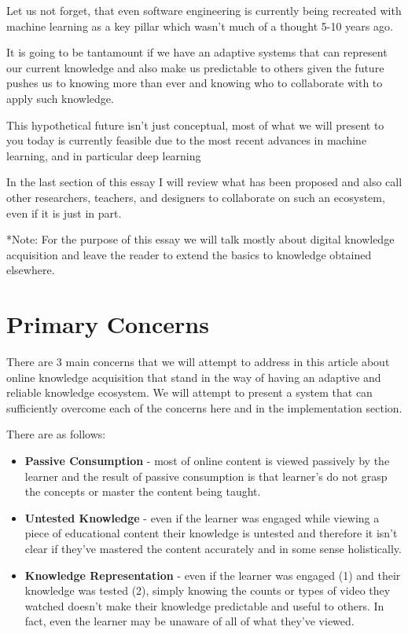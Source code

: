 \documentclass[]{book}
\theoremstyle{definition}
\theoremstyle{definition}
\theoremstyle{definition}
\theoremstyle{remark}
\begin{document}
Let us not forget, that even software engineering is currently being
recreated with machine learning as a key pillar which wasn't much of a
thought 5-10 years ago.

It is going to be tantamount if we have an adaptive systems that can
represent our current knowledge and also make us predictable to others
given the future pushes us to knowing more than ever and knowing who to
collaborate with to apply such knowledge.

This hypothetical future isn't just conceptual, most of what we will
present to you today is currently feasible due to the most recent
advances in machine learning, and in particular deep learning

In the last section of this essay I will review what has been proposed
and also call other researchers, teachers, and designers to collaborate
on such an ecosystem, even if it is just in part.

*Note: For the purpose of this essay we will talk mostly about digital
knowledge acquisition and leave the reader to extend the basics to
knowledge obtained elsewhere.

\chapter{Primary Concerns}\label{primary-concerns}

There are 3 main concerns that we will attempt to address in this
article about online knowledge acquisition that stand in the way of
having an adaptive and reliable knowledge ecosystem. We will attempt to
present a system that can sufficiently overcome each of the concerns
here and in the implementation section.

There are as follows:

\begin{itemize}
\item
  \textbf{Passive Consumption} - most of online content is viewed
  passively by the learner and the result of passive consumption is that
  learner's do not grasp the concepts or master the content being
  taught.
\item
  \textbf{Untested Knowledge} - even if the learner was engaged while
  viewing a piece of educational content their knowledge is untested and
  therefore it isn't clear if they've mastered the content accurately
  and in some sense holistically.
\item
  \textbf{Knowledge Representation} - even if the learner was engaged
  (1) and their knowledge was tested (2), simply knowing the counts or
  types of video they watched doesn't make their knowledge predictable
  and useful to others. In fact, even the learner may be unaware of all
  of what they've viewed.
\end{itemize}
\end{document}
